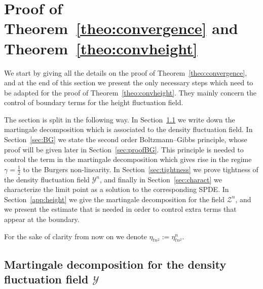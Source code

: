 \documentclass[10pt]{amsart}
\theoremstyle{definition}\newtheorem{defi}[theo]{Definition}\newtheorem{rema}[theo]{Remark}\newtheorem{exam}[theo]{Example}\newtheorem{exem}[theo]{Example}\newtheorem{nota}[theo]{Notation}
\newcommand{\mc}[1]{{\mathcal #1}}
\renewcommand{\mc}[1]{{\mathcal #1}}
\begin{document}
\section{Proof of Theorem~\ref{theo:convergence} and Theorem~\ref{theo:convheight}}
\label{s4}

We start by giving all the details on the proof of Theorem~\ref{theo:convergence}, and at the end of this section we present the only necessary steps which need to be adapted for the proof of Theorem~\ref{theo:convheight}. They mainly concern the control of boundary terms for the height fluctuation field.

The section is split in the following way. In Section~\ref{sec:martingale} we write down the martingale decomposition which is associated to the density fluctuation field. In Section~\ref{sec:BG} we state the second order Boltzmann--Gibbs principle, whose proof will be given later in Section~\ref{sec:proofBG}. This principle is needed to control the term in the martingale decomposition which gives rise in the regime $\gamma=\frac12$ to the Burgers non-linearity. In Section~\ref{sec:tightness} we prove tightness of the density fluctuation field $\mc Y^n$, and finally in Section~\ref{sec:charact} we characterize the limit point as a solution to the corresponding SPDE. In Section~\ref{app:height} we give the martingale decomposition for the field $\mc Z^n$, and we present the estimate that is needed in order to control extra terms that appear at the boundary.

For the sake of clarity from now on we denote $\eta_{tn^2}:=\eta^n_{tn^2}$.

\subsection{Martingale decomposition for the density fluctuation field \texorpdfstring{$\mc Y$}{Y}}\label{sec:martingale}
\end{document}

